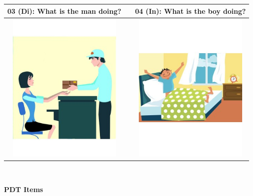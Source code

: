 \begin{tabular}{|c|c|c|}
\hline
03 (Di): What is the man doing? && 04 (In): What is the boy doing? \\
\hline
\includegraphics[width=15em,trim=0 0 0 -3]{figures/I03.jpg} & & \includegraphics[width=15em,trim=0 0 0 -3]{figures/I04.jpg} \\
\hline
\end{tabular}
\vspace{1em} \\

\clearpage

{\large \textbf{PDT Items}}

\vspace{2em}

